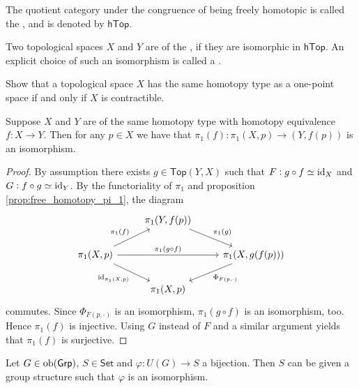 \begin{definition}
	The quotient category under the congruence of being freely homotopic is called the , and is denoted by $\mathsf{hTop}$.
\end{definition}

\begin{definition}
	Two topological spaces $X$ and $Y$ are of the , if they are isomorphic in $\mathsf{hTop}$. An explicit choice of such an isomorphism is called a .
\end{definition}

\begin{exercise}
	Show that a topological space $X$ has the same homotopy type as a one-point space if and only if $X$ is contractible.
\end{exercise}

\begin{theorem}
	Suppose $X$ and $Y$ are of the same homotopy type with homotopy equivalence $f : X \to Y$. Then for any $p \in X$ we have that $\pi_1(f) : \pi_1(X,p) \to (Y,f(p))$ is an isomorphism.
	\label{thm:homotopy_invariance_pi_1}
\end{theorem}

\begin{proof}
	By assumption there exists $g \in \mathsf{Top}(Y,X)$ such that $F : g \circ f \simeq \operatorname{id}_X$ and $G : f \circ g \simeq \operatorname{id}_Y$. By the functoriality of $\pi_1$ and proposition \ref{prop:free_homotopy_pi_1}, the diagram
	\begin{equation*}
		\begin{tikzcd}
			& \pi_1(Y,f(p)) \arrow[dr,"\pi_1(g)"]\\
			\pi_1(X,p) \arrow[ur,"\pi_1(f)"]\arrow[dr,"\id_{\pi_1(X,p)}"']\arrow[rr,"\pi_1(g\circ f)"] & & \pi_1(X,g(f(p))) \arrow[dl,"\Phi_{F(p,\cdot)}"]\\
			& \pi_1(X,p)
		\end{tikzcd}
	\end{equation*}
	\noindent commutes. Since $\Phi_{F(p,\cdot)}$ is an isomorphism, $\pi_1(g \circ f)$ is an isomorphism, too. Hence $\pi_1(f)$ is injective. Using $G$ instead of $F$ and a similar argument yields that $\pi_1(f)$ is surjective.
\end{proof}

\begin{lemma}
	\label{lem:induced_group_structure}
	Let $G \in \operatorname{ob}(\mathsf{Grp})$, $S \in \mathsf{Set}$ and $\varphi : U(G) \to S$ a bijection. Then $S$ can be given a group structure such that $\varphi$ is an isomorphism.
\end{lemma}

